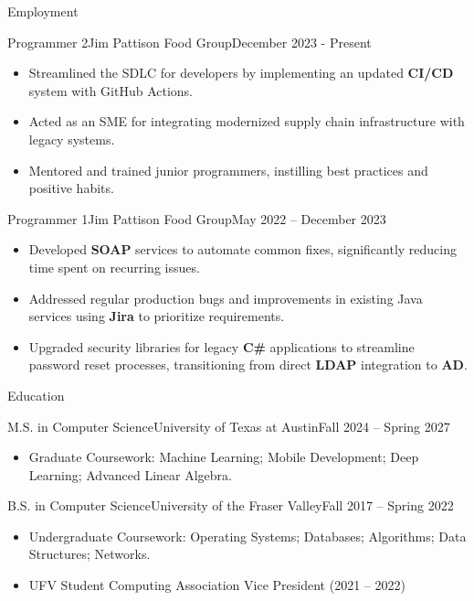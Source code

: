 \documentclass[]{mcdowellcv}
\begin{document}
	\makeheader
	
	\begin{cvsection}{Employment}
		\begin{cvsubsection}{Programmer 2}{Jim Pattison Food Group}{December 2023 - Present}		
			\begin{itemize}
				\item Streamlined the SDLC for developers by implementing an updated \textbf{CI/CD} system with GitHub Actions.
				\item Acted as an SME for integrating modernized supply chain infrastructure with legacy systems.
				\item Mentored and trained junior programmers, instilling best practices and positive habits.

			\end{itemize}
		\end{cvsubsection}
		
		\begin{cvsubsection}{Programmer 1}{Jim Pattison Food Group}{May 2022 -- December 2023}	
			\begin{itemize}
				\item Developed \textbf{SOAP} services to automate common fixes, significantly reducing time spent on recurring issues.
				\item Addressed regular production bugs and improvements in existing Java services using \textbf{Jira} to prioritize requirements.
				\item Upgraded security libraries for legacy \textbf{C\#} applications to streamline password reset processes, transitioning from direct \textbf{LDAP} integration to \textbf{AD}.
			\end{itemize}
		\end{cvsubsection}
	\end{cvsection}
	
	\begin{cvsection}{Education}
		\begin{cvsubsection}{M.S. in Computer Science}{University of Texas at Austin}{Fall 2024 -- Spring 2027}
			\begin{itemize}
				\item Graduate Coursework: Machine Learning; Mobile Development; Deep Learning; Advanced Linear Algebra.
			\end{itemize}
		\end{cvsubsection}
		\begin{cvsubsection}{B.S. in Computer Science}{University of the Fraser Valley}{Fall 2017 -- Spring 2022}
			\begin{itemize}
				\item Undergraduate Coursework: Operating Systems; Databases; Algorithms; Data Structures; Networks.
				\item UFV Student Computing Association Vice President (2021 – 2022)
			\end{itemize}
		\end{cvsubsection}
	\end{cvsection}
	
\end{document}
